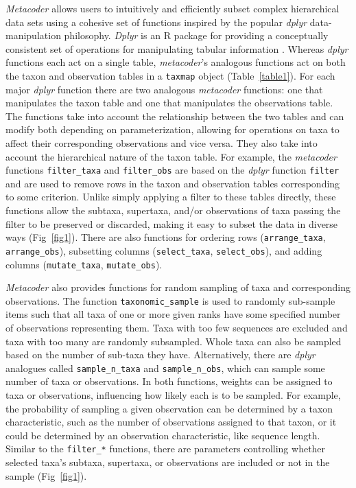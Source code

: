 \documentclass[10pt,letterpaper]{article}
\begin{document}
\emph{Metacoder} allows users to intuitively and efficiently subset
complex hierarchical data sets using a cohesive set of functions
inspired by the popular \emph{dplyr} data-manipulation philosophy.
\emph{Dplyr} is an R package for providing a conceptually consistent set
of operations for manipulating tabular information
\cite{hadley2016dplyr}. Whereas \emph{dplyr} functions each act on a
single table, \emph{metacoder}'s analogous functions act on both the
taxon and observation tables in a \texttt{taxmap} object (Table~\ref{table1}).
For each major \emph{dplyr} function there are two
analogous \emph{metacoder} functions: one that manipulates the taxon
table and one that manipulates the observations table. The functions
take into account the relationship between the two tables and can modify
both depending on parameterization, allowing for operations on taxa to
affect their corresponding observations and vice versa. They also take
into account the hierarchical nature of the taxon table. For example,
the \emph{metacoder} functions \texttt{filter\_taxa} and
\texttt{filter\_obs} are based on the \emph{dplyr} function
\texttt{filter} and are used to remove rows in the taxon and observation
tables corresponding to some criterion. Unlike simply applying a filter
to these tables directly, these functions allow the subtaxa, supertaxa,
and/or observations of taxa passing the filter to be preserved or
discarded, making it easy to subset the data in diverse ways (Fig~\ref{fig1}).
There are also functions for ordering rows (\texttt{arrange\_taxa},
\texttt{arrange\_obs}), subsetting columns (\texttt{select\_taxa},
\texttt{select\_obs}), and adding columns (\texttt{mutate\_taxa},
\texttt{mutate\_obs}).

\emph{Metacoder} also provides functions for random sampling of taxa and
corresponding observations. The function \texttt{taxonomic\_sample} is
used to randomly sub-sample items such that all taxa of one or more
given ranks have some specified number of observations representing
them. Taxa with too few sequences are excluded and taxa with too many
are randomly subsampled. Whole taxa can also be sampled based on the
number of sub-taxa they have. Alternatively, there are \emph{dplyr}
analogues called \texttt{sample\_n\_taxa} and \texttt{sample\_n\_obs},
which can sample some number of taxa or observations. In both functions,
weights can be assigned to taxa or observations, influencing how likely
each is to be sampled. For example, the probability of sampling a given
observation can be determined by a taxon characteristic, such as the
number of observations assigned to that taxon, or it could be determined
by an observation characteristic, like sequence length. Similar to the
\texttt{filter\_*} functions, there are parameters controlling whether
selected taxa's subtaxa, supertaxa, or observations are included or not
in the sample (Fig~\ref{fig1}).
\end{document}
